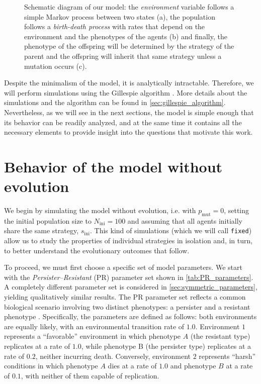 \documentclass[aps,pre,reprint,10pt,superscriptaddress]{revtex4-2}
\begin{document}
\begin{figure}
{
    }
    \caption{Schematic diagram of our model: the \emph{environment} variable follows a simple Markov process between two states (a), the population follows a \emph{birth-death process} with rates that depend on the environment and the phenotypes of the agents (b) and finally, the phenotype of the offspring will be determined by the strategy of the parent and the offspring will inherit that same strategy unless a mutation occurs (c).} \label{fig:model_diagram}
\end{figure}

Despite the minimalism of the model, it is analytically intractable. Therefore, we will perform simulations using the Gillespie algorithm \cite{toralStochasticNumericalMethods}. More details about the simulations and the algorithm can be found in \cref{sec:gillespie_algorithm}. Nevertheless, as we will see in the next sections, the model is simple enough that its behavior can be readily analyzed, and at the same time it contains all the necessary elements to provide insight into the questions that motivate this work.

\section{Behavior of the model without evolution} \label{sec:no_evolution}

We begin by simulating the model without evolution, i.e. with $p_\text{mut}=0$, setting the initial population size to $N_\text{ini}=100$ and assuming that all agents initially share the same strategy, $s_\text{ini}$. This kind of simulations (which we will call \texttt{fixed}) allow us to study the properties of individual strategies in isolation and, in turn, to better understand the evolutionary outcomes that follow.

To proceed, we must first choose a specific set of model parameters. We start with the \emph{Persister--Resistant} (PR) parameter set shown in \cref{tab:PR_parameters}. A completely different parameter set is considered in \cref{sec:symmetric_parameters}, yielding qualitatively similar results. The PR parameter set reflects a common biological scenario involving two distinct phenotypes: a persister and a resistant phenotype \cite{patraEmergencePhenotypeSwitching2015,huftonPhenotypicSwitchingPopulations2018}. Specifically, the parameters are defined as follows: both environments are equally likely, with an environmental transition rate of $1.0$. Environment $1$ represents a ``favorable'' environment in which phenotype $A$ (the resistant type) replicates at a rate of $1.0$, while phenotype B (the persister type) replicates at a rate of $0.2$, neither incurring death. Conversely, environment $2$ represents ``harsh'' conditions in which phenotype $A$ dies at a rate of $1.0$ and phenotype $B$ at a rate of $0.1$, with neither of them capable of replication.
\end{document}
